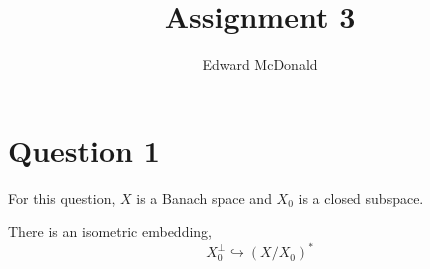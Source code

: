 \documentclass{unswmaths}
\begin{document}
\subject{Functional Analysis}
\author{Edward McDonald}
\title{Assignment 3}


\newcommand{\Real}{\operatorname{Re}}
\newcommand{\Img}{\operatorname{Im}}
\newcommand{\lan}{\langle}
\newcommand{\ran}{\rangle}
\newcommand{\Proj}{\mathbb{P}_+}
\newcommand{\isom}{\cong}


\unswtitle{}
\section*{Question 1}
For this question, $X$ is a Banach space and $X_0$ is a closed subspace.
\begin{lemma}
    There is an isometric embedding,
    \begin{equation*}
        X_0^\perp \hookrightarrow (X/X_0)^*
    \end{equation*}
\end{lemma}
\end{document}
